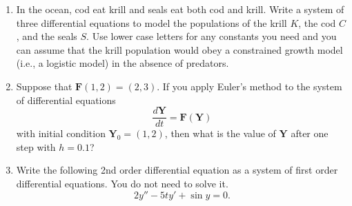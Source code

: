 \documentclass[10pt]{article}
\begin{document}
\begin{enumerate}
\setcounter{enumi}{\theenumCount}

\item In the ocean, cod eat krill and seals eat both cod and krill.  Write a system of three differential equations to model the populations of the krill $K$, the cod $C$, and the seals $S$.  Use lower case letters for any constants you need and you can assume that the krill population would obey a constrained growth model (i.e., a logistic model) in the absence of predators. 
\vfill


\item Suppose that $\mathbf{F}(1,2) = (2,3)$.  If you apply Euler's method to the system of differential equations 
$$\dfrac{d\mathbf{Y}}{dt} = \mathbf{F}(\mathbf{Y})$$
with initial condition $\mathbf{Y}_0 = (1,2)$,
then what is the value of $\mathbf{Y}$ after one step with $h = 0.1$? 
\vfill

\newpage
\item Write the following 2nd order differential equation as a system of first order differential equations.  You do not need to solve it.
$$2y'' - 5ty' + \sin y = 0.$$
\vfill

\setcounter{enumCount}{\theenumi}
\end{enumerate}
\end{document}
